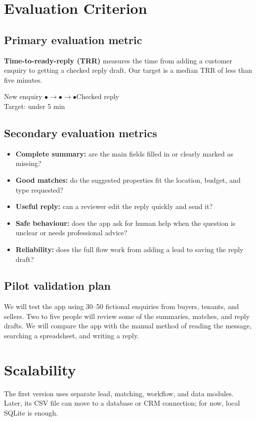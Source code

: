 \documentclass[10pt,a4paper]{article}
\newcommand{\metricdiagram}{\begin{center}\small New enquiry \quad$\bullet\longrightarrow\bullet\longrightarrow\bullet$\quad Checked reply\\[-2pt]Target: under 5 min\end{center}}
\begin{document}
\section{Evaluation Criterion}
\subsection{Primary evaluation metric}
\textbf{Time-to-ready-reply (TRR)} measures the time from adding a customer enquiry to getting a checked reply draft. Our target is a median TRR of less than five minutes.
\metricdiagram

\subsection{Secondary evaluation metrics}
\begin{itemize}
    \item \textbf{Complete summary:} are the main fields filled in or clearly marked as missing?
    \item \textbf{Good matches:} do the suggested properties fit the location, budget, and type requested?
    \item \textbf{Useful reply:} can a reviewer edit the reply quickly and send it?
    \item \textbf{Safe behaviour:} does the app ask for human help when the question is unclear or needs professional advice?
    \item \textbf{Reliability:} does the full flow work from adding a lead to saving the reply draft?
\end{itemize}

\subsection{Pilot validation plan}
We will test the app using 30--50 fictional enquiries from buyers, tenants, and sellers. Two to five people will review some of the summaries, matches, and reply drafts. We will compare the app with the manual method of reading the message, searching a spreadsheet, and writing a reply.

\section{Scalability}
The first version uses separate lead, matching, workflow, and data modules. Later, its CSV file can move to a database or CRM connection; for now, local SQLite is enough.
\end{document}

